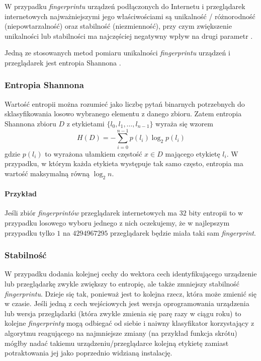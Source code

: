 W przypadku \emph{fingerprintu} urządzeń podłączonych do Internetu i
przeglądarek internetowych najważniejszymi jego właściwościami są unikalność /
różnorodność (niepowtarzalność) oraz stabilność (niezmienność), przy czym
zwiększenie unikalności lub stabilności ma najczęściej negatywny wpływ na drugi
parametr \cite[s. 11]{eckersley2010unique}.

Jedną ze stosowanych metod pomiaru unikalności \emph{fingerprintu} urządzeń i
przeglądarek jest entropia Shannona \cite[s. 6]{eckersley2010unique}.

\subsubsection{Entropia Shannona}
Wartość entropii można rozumieć jako liczbę pytań binarnych potrzebnych do
sklasyfikowania losowo wybranego elementu z danego zbioru. Zatem entropia
Shannona zbioru \(D\) z etykietami \(\{l_{0}, l_{1}, \dots, l_{n - 1}\}\) wyraża
się wzorem \[H(D) = -{\sum_{i = 0}^{n - 1}{p(l_{i})\log_{2}{p(l_{i})}}}\] gdzie
\(p(l_{i})\) to wyrażona ułamkiem częstość \(x \in D\) mającego etykietę
\(l_{i}\). W przypadku, w którym każda etykieta występuje tak samo często,
entropia ma wartość maksymalną równą \(\log_{2}{n}\).

\paragraph{Przykład}
Jeśli zbiór \emph{fingerprintów} przeglądarek internetowych ma \(32\) bity
entropii to w przypadku losowego wyboru jednego z nich oczekujemy, że w
najlepszym przypadku tylko \(1\) na \(4294967295\) przeglądarek będzie miała
taki sam \emph{fingerprint}.

\subsubsection{Stabilność}
W przypadku dodania kolejnej cechy do wektora cech identyfikującego urządzenie
lub przeglądarkę zwykle zwiększy to entropię, ale także zmniejszy stabilność
\emph{fingerprintu}. Dzieje się tak, ponieważ jest to kolejna rzecz, która może
zmienić się w czasie. Jeśli jedną z cech wejściowych jest wersja oprogramowania
urządzenia lub wersja przeglądarki (która zwykle zmienia się parę razy w ciągu
roku) to kolejne \emph{fingerprinty} mogą odbiegać od siebie i naiwny
klasyfikator korzystający z algorytmu reagującego na najmniejsze zmiany (na
przykład funkcja skrótu) mógłby nadać takiemu urządzeniu/przeglądarce kolejną
etykietę zamiast potraktowania jej jako poprzednio widzianą instalację.

